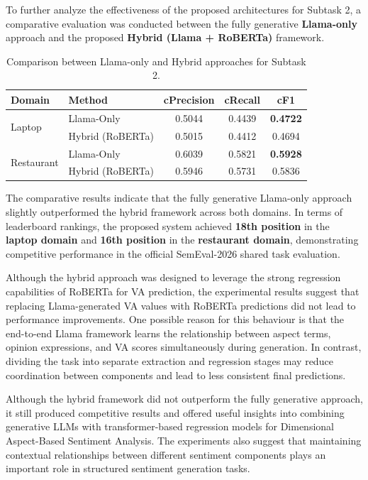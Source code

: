 \documentclass{article}
\begin{document}
To further analyze the effectiveness of the proposed architectures for Subtask 2, a comparative evaluation was conducted between the fully generative \textbf{Llama-only} approach and the proposed \textbf{Hybrid (Llama + RoBERTa)} framework.

\begin{table}[htbp]
\centering
\caption{Comparison between Llama-only and Hybrid approaches for Subtask 2.}
\label{tab:hybrid_comparison}
\begin{tabular}{llccc}
\hline
\textbf{Domain} & \textbf{Method} & \textbf{cPrecision} & \textbf{cRecall} & \textbf{cF1} \\
\hline
\multirow{2}{*}{Laptop}
& Llama-Only & 0.5044 & 0.4439 & \textbf{0.4722} \\
& Hybrid (RoBERTa) & 0.5015 & 0.4412 & 0.4694 \\
\hline
\multirow{2}{*}{Restaurant}
& Llama-Only & 0.6039 & 0.5821 & \textbf{0.5928} \\
& Hybrid (RoBERTa) & 0.5946 & 0.5731 & 0.5836 \\
\hline
\end{tabular}
\end{table}

The comparative results indicate that the fully generative Llama-only approach slightly outperformed the hybrid framework across both domains. In terms of leaderboard rankings, the proposed system achieved \textbf{18th position} in the \textbf{laptop domain} and \textbf{16th position} in the \textbf{restaurant domain}, demonstrating competitive performance in the official SemEval-2026 shared task evaluation.

Although the hybrid approach was designed to leverage the strong regression capabilities of RoBERTa for VA prediction, the experimental results suggest that replacing Llama-generated VA values with RoBERTa predictions did not lead to performance improvements. One possible reason for this behaviour is that the end-to-end Llama framework learns the relationship between aspect terms, opinion expressions, and VA scores simultaneously during generation. In contrast, dividing the task into separate extraction and regression stages may reduce coordination between components and lead to less consistent final predictions.

Although the hybrid framework did not outperform the fully generative approach, it still produced competitive results and offered useful insights into combining generative LLMs with transformer-based regression models for Dimensional Aspect-Based Sentiment Analysis. The experiments also suggest that maintaining contextual relationships between different sentiment components plays an important role in structured sentiment generation tasks.
\end{document}

